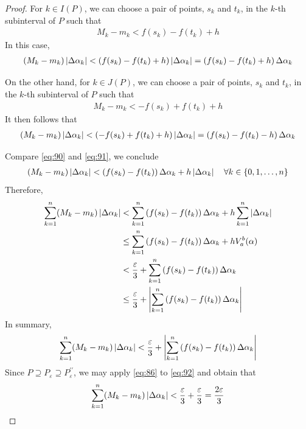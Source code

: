 \documentclass[thmcnt=section, 12pt]{my-elegantbook}
\begin{document}
\begin{proof}
    For $k \in I(P)$, we can choose a pair of points, $s_k$ and $t_k$, in the $k$-th subinterval of $P$ such that
    \begin{align*}
        M_k - m_k < f(s_k) - f(t_k) + h
    \end{align*}
    In this case,
    \begin{align}
        (M_k - m_k)\left\lvert \Delta\alpha_k \right\rvert
        < \left(f(s_k) - f(t_k) + h\right)\left\lvert \Delta\alpha_k \right\rvert
        =  \left(f(s_k) - f(t_k) + h\right) \Delta\alpha_k
        \label{eq:90}
    \end{align}

    On the other hand, for $k \in J(P)$, we can choose a pair of points, $s_k$ and $t_k$, in the $k$-th subinterval of $P$ such that
    \begin{align*}
        M_k - m_k < -f(s_k) + f(t_k) + h
    \end{align*}
    It then follows that
    \begin{align}
        (M_k - m_k)\left\lvert \Delta\alpha_k \right\rvert
        < \left(-f(s_k) + f(t_k) + h\right)\left\lvert \Delta\alpha_k \right\rvert
        =  \left(f(s_k) - f(t_k) - h\right) \Delta\alpha_k
        \label{eq:91}
    \end{align}

    Compare \eqref{eq:90} and \eqref{eq:91}, we conclude
    \begin{align*}
        (M_k - m_k)\left\lvert \Delta\alpha_k \right\rvert
        < \left(f(s_k) - f(t_k)\right) \Delta\alpha_k
        + h \left\lvert \Delta\alpha_k \right\rvert
        \quad \forall k \in \left\{0, 1, \ldots, n\right\}
    \end{align*}
    Therefore,
    \begin{align*}
        \sum_{k=1}^n (M_k - m_k) \left\lvert \Delta\alpha_k \right\rvert
         & < \sum_{k=1}^n \left(f(s_k) - f(t_k)\right) \Delta\alpha_k + h \sum_{k=1}^n \left\lvert \Delta\alpha_k \right\rvert \\
         & \leq \sum_{k=1}^n \left(f(s_k) - f(t_k)\right) \Delta\alpha_k + h V_a^b (\alpha)                 \\
         & < \frac{\varepsilon}{3} + \sum_{k=1}^n \left(f(s_k) - f(t_k)\right)\Delta\alpha_k                \\
         & \leq \frac{\varepsilon}{3} + \left\lvert \sum_{k=1}^n \left(f(s_k) - f(t_k)\right)\Delta\alpha_k \right\rvert
    \end{align*}
    In summary,
    \begin{align}
        \sum_{k=1}^n (M_k - m_k) \left\lvert \Delta\alpha_k \right\rvert
        < \frac{\varepsilon}{3} + \left\lvert \sum_{k=1}^n \left(f(s_k) - f(t_k)\right)\Delta\alpha_k \right\rvert
        \label{eq:92}
    \end{align}
    Since $P \supseteq P_\varepsilon \supseteq P^{\prime\prime}_\varepsilon$, we may apply \eqref{eq:86} to \eqref{eq:92} and obtain that
    \begin{align}
        \sum_{k=1}^n (M_k - m_k) \left\lvert \Delta\alpha_k \right\rvert
        < \frac{\varepsilon}{3} + \frac{\varepsilon}{3}
        = \frac{2\varepsilon}{3}
        \label{eq:93}
    \end{align}


\end{proof}
\end{document}
